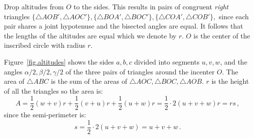 \documentclass[11pt,a4paper]{article}
\begin{document}
Drop altitudes from $O$ to the sides. This results in pairs of congruent \emph{right} triangles $\{\triangle AOB', \triangle AOC'\},\{\triangle BOA', \triangle BOC'\},\{\triangle COA', \triangle COB'\},$ since each pair shares a joint hypotenuse and the bisected angles are equal. It follows that the lengths of the altitudes are equal which we denote by $r$. $O$ is the center of the inscribed circle with radius $r$.

Figure~\ref{fig.altitudes} shows the sides $a,b,c$ divided into segments $u,v,w$, and the angles $\alpha/2,\beta/2,\gamma/2$ of the three pairs of triangles around the incenter $O$. The area of $\triangle ABC$ is the sum of the areas of $\triangle AOC, \triangle BOC, \triangle AOB$. $r$ is the height of all the triangles so the area is:
\begin{equation}
A = \frac{1}{2}(w+v)r + \frac{1}{2}(v+u)r + \frac{1}{2}(u+w)r = \frac{1}{2}\cdot 2(u+v+w)r = rs\,, \label{eq.area1}
\end{equation}
since the semi-perimeter is:
\begin{equation}
s=\frac{1}{2}\cdot 2 (u+v+w)=u+v+w\,.\label{eq.semi}
\end{equation}

\vspace*{-8ex}
\end{document}
